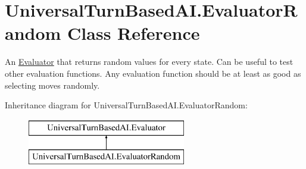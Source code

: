 \hypertarget{class_universal_turn_based_a_i_1_1_evaluator_random}{}\section{Universal\+Turn\+Based\+A\+I.\+Evaluator\+Random Class Reference}
\label{class_universal_turn_based_a_i_1_1_evaluator_random}


An \hyperlink{class_universal_turn_based_a_i_1_1_evaluator}{Evaluator} that returns random values for every state. Can be useful to test other evaluation functions. Any evaluation function should be at least as good as selecting moves randomly.  


Inheritance diagram for Universal\+Turn\+Based\+A\+I.\+Evaluator\+Random\+:\begin{figure}[H]
\begin{center}
\leavevmode
\includegraphics[height=2.000000cm]{class_universal_turn_based_a_i_1_1_evaluator_random}
\end{center}
\end{figure}

